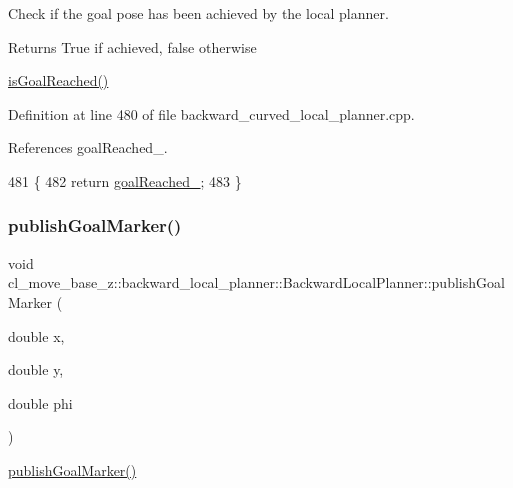 Check if the goal pose has been achieved by the local planner. 

\begin{DoxyReturn}{Returns}
True if achieved, false otherwise
\end{DoxyReturn}
\hyperlink{classcl__move__base__z_1_1backward__local__planner_1_1BackwardLocalPlanner_a06a99e609ed31b97f765351dd6827722}{is\+Goal\+Reached()} 

Definition at line 480 of file backward\+\_\+curved\+\_\+local\+\_\+planner.\+cpp.



References goal\+Reached\+\_\+.


\begin{DoxyCode}
481         \{
482             \textcolor{keywordflow}{return} \hyperlink{classcl__move__base__z_1_1backward__local__planner_1_1BackwardLocalPlanner_ad443c52ef585a8eab0364f0909222f51}{goalReached\_};
483         \}
\end{DoxyCode}
\mbox{\label{classcl__move__base__z_1_1backward__local__planner_1_1BackwardLocalPlanner_a70eaeb6cf31fd3378d9fbf9bcb975995}} 
\subsubsection{\texorpdfstring{publish\+Goal\+Marker()}{publishGoalMarker()}}
{\footnotesize\ttfamily void cl\+\_\+move\+\_\+base\+\_\+z\+::backward\+\_\+local\+\_\+planner\+::\+Backward\+Local\+Planner\+::publish\+Goal\+Marker (\begin{DoxyParamCaption}\item[{double}]{x,  }\item[{double}]{y,  }\item[{double}]{phi }\end{DoxyParamCaption})\hspace{0.3cm}{\ttfamily [private]}}

\hyperlink{classcl__move__base__z_1_1backward__local__planner_1_1BackwardLocalPlanner_a70eaeb6cf31fd3378d9fbf9bcb975995}{publish\+Goal\+Marker()} 

